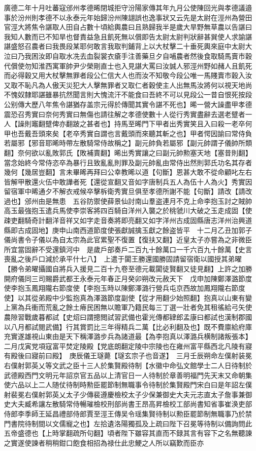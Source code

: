 廣德二年十月吐蕃寇邠州孝德晞閉城拒守汾陽家傳其年九月公使陳回光與孝德議邉事於汾州則孝德不以永泰元年始歸汾州陳翃誤也逸事狀又云先是太尉在涇州為營田官涇大將焦令諶取人田自占數十頃給輿農曰且熟歸我半是歲大旱野無草農以告諶曰我知人數而已不知旱也督責益急且飢死無以償即告太尉太尉判狀辭甚巽使人求諭諶諶盛怒召農者曰我畏段某耶何敢言我取判鋪背上以大杖擊二十垂死輿來庭中太尉大泣曰乃我困汝即自取水冼去血裂裳衣瘡手注善藥旦夕自哺農者然後食取騎馬賣市穀代償使勿知淮西寓軍帥尹少榮剛直士也入見諶大罵曰汝誠人邪涇州野如赭人且飢死而必得穀又用大杖擊無罪者段公仁信大人也而汝不知敬今段公唯一馬賤賣市穀入汝又取不恥凡為人傲天災犯大人擊無罪者又取仁者穀使主人出無馬汝將何以視天地尚不愧奴隸耶諶雖暴抗然聞言則大愧流汗不能食曰吾終不可以見段公一昔自恨死按段公别傳大歷八年焦令諶猶存盖宗元得於傳聞其實令諶不死也】晞一營大譟盡甲孝德震恐召秀實曰奈何秀實曰無傷也請往解之孝德使數十人從行秀實盡辭去選老躄者一人【譟則竈翻躄俾亦翻跛之甚者也】持馬至晞門下甲者出秀實笑且入曰殺一老卒何甲也吾戴吾頭來矣【老卒秀實自謂也言戴頭而來聽其斬之也】甲者愕因諭曰常侍負若屬邪【邪音耶晞時帶左散騎常侍故稱之】副元帥負若屬邪【副元帥謂子儀帥所類翻】奈何欲以亂敗郭氏【敗補賣翻】晞出秀實讓之曰副元帥勲塞天地【塞昔則翻】當念始終今常侍恣卒為暴行且致亂亂則罪及副元帥亂由常侍出然則郭氏功名其存者幾何【幾居豈翻】言未畢晞再拜曰公幸教晞以道【句斷】恩甚大敢不從命顧叱左右皆解甲散還火伍中敢譁者死【還從宣翻又音如字唐制兵五人為伍十人為火】秀實因留宿軍中晞通夕不解衣戒候卒擊柝衛秀實旦俱至孝德所謝不能【句斷】請改【請改過也】邠州由是無患　五谷防禦使薛景仙討南山羣盗連月不克上命李抱玉討之賊帥高玉最強抱玉遣兵馬使李崇客將四百騎自洋州入襲之於桃虢川大破之玉走成固【使疎吏翻騎奇計翻洋音祥又如字走音奏將即亮翻又如字洋州古成固縣唐志洋州治興道縣即古成固地】庚申山南西道節度使張獻誠擒玉獻之餘盗皆平　十二月乙丑加郭子儀尚書令子儀以為自太宗為此官累聖不復置【復扶又翻】近皇太子亦嘗為之非微臣所宜當固辭不受還鎮河中　是歲戶部奏戶二百九十餘萬口一千六百九十餘萬【史言喪亂之後戶口減於承平什七八】　上遣于闐王勝還國勝固請留宿衛以國授其弟曜【勝令弟曜攝國自將兵入援見二百十九卷至德元載闐徒賢翻又徒見翻】上許之加勝開府儀同三司賜爵武都王永泰元年春正月癸卯朔改元赦天下　戊申加陳鄭澤潞節度使李抱玉鳳翔隴右節度使【李抱玉時以陳鄭澤潞行營兵屯京西故加鳳翔隴右節度使】以其從弟殿中少監抱真為澤潞節度副使【從才用翻少始照翻】抱真以山東有變上黨為兵衝而荒亂之餘土瘠民困無以贍軍乃籍民每三丁選一壯者免其租徭給弓矢使農隙習戰歲暮都試【史炤曰謂摠閲試習武備也霍光傳都肄郎孟康曰都試也漢制郡國以八月都試閱武備】行其賞罰比三年得精兵二萬【比必利翻及也】既不費廪給府庫充實遂雄視山東由是天下稱澤潞步兵為諸道最【為李抱真以澤潞兵横制諸叛張本】　二月戊寅党項寇富平焚定陵殿【党底朗翻定陵中宗陵也在雍州富平縣西北凡陵有寢有殿後曰寢前曰殿】　庚辰儀王璲薨【璲玄宗子也音遂】　三月壬辰朔命左僕射装冕右僕射郭英乂等文武之臣十三人於集賢殿待制【水徽中命弘文館學士二人日待制於武德殿西門文明元年詔京官五品以上清官日一人待制於章善明福門先天末又命朝集使六品以上二人随仗待制時勲臣罷節制無職事令待制於集賢殿門宋白曰是年詔左僕射裴冕右僕射郭英乂太子少傳裴遵慶檢校太子少保兼御史大夫元志直太子詹事兼御史大夫臧希讓左散騎常侍暢璀檢校刑部尚書王昂高昇檢校工部尚書知省事崔涣吏部侍郎李季師王延昌禮部侍郎賈至涇王傳吴令瑶集賢待制以勲臣罷節制無職事乃於禁門書院待制間以文儒寵之也】左拾遺洛陽獨孤及上疏曰陛下召冕等待制以備詢問此五帝盛德也【上時掌翻疏所句翻】頃者陛下雖容其直而不録其言有容下之名無聽諫之實遂使諫者稍稍鉗口飽食相招為禄仕此忠鯁之人所以竊歎而臣亦